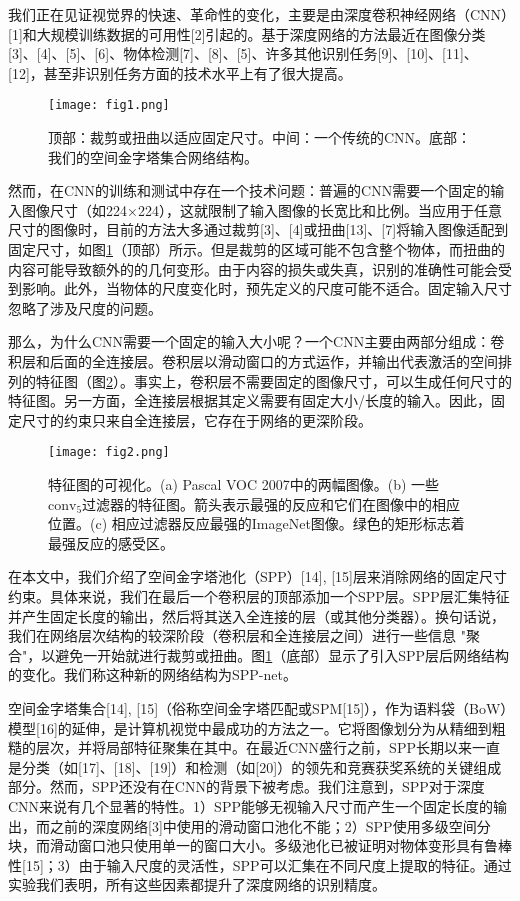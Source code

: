 \documentclass[../main.tex]{subfile}
\begin{document}
我们正在见证视觉界的快速、革命性的变化，主要是由深度卷积神经网络（CNN）[1]和大规模训练数据的可用性[2]引起的。基于深度网络的方法最近在图像分类[3]、[4]、[5]、[6]、物体检测[7]、[8]、[5]、许多其他识别任务[9]、[10]、[11]、[12]，甚至非识别任务方面的技术水平上有了很大提高。

\begin{figure}[htb]
    \centering
    \texttt{[image: fig1.png]}
    \caption{顶部：裁剪或扭曲以适应固定尺寸。中间：一个传统的CNN。底部：我们的空间金字塔集合网络结构。}
    \label{fig:fig1}
\end{figure}

然而，在CNN的训练和测试中存在一个技术问题：普遍的CNN需要一个固定的输入图像尺寸（如224×224），这就限制了输入图像的长宽比和比例。当应用于任意尺寸的图像时，目前的方法大多通过裁剪[3]、[4]或扭曲[13]、[7]将输入图像适配到固定尺寸，如图\ref{fig:fig1}（顶部）所示。但是裁剪的区域可能不包含整个物体，而扭曲的内容可能导致额外的的几何变形。由于内容的损失或失真，识别的准确性可能会受到影响。此外，当物体的尺度变化时，预先定义的尺度可能不适合。固定输入尺寸忽略了涉及尺度的问题。

那么，为什么CNN需要一个固定的输入大小呢？一个CNN主要由两部分组成：卷积层和后面的全连接层。卷积层以滑动窗口的方式运作，并输出代表激活的空间排列的特征图（图\ref{fig:fig2}）。事实上，卷积层不需要固定的图像尺寸，可以生成任何尺寸的特征图。另一方面，全连接层根据其定义需要有固定大小/长度的输入。因此，固定尺寸的约束只来自全连接层，它存在于网络的更深阶段。

\begin{figure}[htb]
    \centering
    \texttt{[image: fig2.png]}
    \caption{特征图的可视化。(a) Pascal VOC 2007中的两幅图像。(b) 一些$\text{conv}_5$过滤器的特征图。箭头表示最强的反应和它们在图像中的相应位置。(c) 相应过滤器反应最强的ImageNet图像。绿色的矩形标志着最强反应的感受区。}
    \label{fig:fig2}
\end{figure}

在本文中，我们介绍了空间金字塔池化（SPP）[14], [15]层来消除网络的固定尺寸约束。具体来说，我们在最后一个卷积层的顶部添加一个SPP层。SPP层汇集特征并产生固定长度的输出，然后将其送入全连接的层（或其他分类器）。换句话说，我们在网络层次结构的较深阶段（卷积层和全连接层之间）进行一些信息 "聚合"，以避免一开始就进行裁剪或扭曲。图\ref{fig:fig1}（底部）显示了引入SPP层后网络结构的变化。我们称这种新的网络结构为SPP-net。

空间金字塔集合[14], [15]（俗称空间金字塔匹配或SPM[15]），作为语料袋（BoW）模型[16]的延伸，是计算机视觉中最成功的方法之一。它将图像划分为从精细到粗糙的层次，并将局部特征聚集在其中。在最近CNN盛行之前，SPP长期以来一直是分类（如[17]、[18]、[19]）和检测（如[20]）的领先和竞赛获奖系统的关键组成部分。然而，SPP还没有在CNN的背景下被考虑。我们注意到，SPP对于深度CNN来说有几个显著的特性。1）SPP能够无视输入尺寸而产生一个固定长度的输出，而之前的深度网络[3]中使用的滑动窗口池化不能；2）SPP使用多级空间分块，而滑动窗口池只使用单一的窗口大小。多级池化已被证明对物体变形具有鲁棒性[15]；3）由于输入尺度的灵活性，SPP可以汇集在不同尺度上提取的特征。通过实验我们表明，所有这些因素都提升了深度网络的识别精度。
\end{document}
